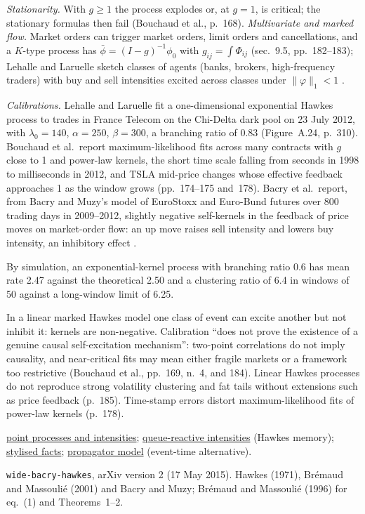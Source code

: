 \begin{qfmodel}
\emph{Stationarity.} With $g\ge1$ the process explodes or, at $g=1$, is critical; the stationary formulas then fail (Bouchaud et al., p.~168). \emph{Multivariate and marked flow.} Market orders can trigger market orders, limit orders and cancellations, and a $K$-type process has $\bar\phi=(I-g)^{-1}\phi_0$ with $g_{ij}=\int\Phi_{ij}$ (sec.~9.5, pp.~182--183); Lehalle and Laruelle sketch classes of agents (banks, brokers, high-frequency traders) with buy and sell intensities excited across classes under $\|\varphi\|_1<1$ \citep[app.~A, sec.~A.12.3, pp.~315--316]{alpha-laruelle}.

 \emph{Calibrations.} Lehalle and Laruelle fit a one-dimensional exponential Hawkes process to trades in France Telecom on the Chi-Delta dark pool on 23 July 2012, with $\lambda_0=140$, $\alpha=250$, $\beta=300$, a branching ratio of 0.83 (Figure~A.24, p.~310). Bouchaud et al.\ report maximum-likelihood fits across many contracts with $g$ close to 1 and power-law kernels, the short time scale falling from seconds in 1998 to milliseconds in 2012, and TSLA mid-price changes whose effective feedback approaches 1 as the window grows (pp.~174--175 and~178). Bacry et al.\ report, from Bacry and Muzy's model of EuroStoxx and Euro-Bund futures over 800 trading days in 2009--2012, slightly negative self-kernels in the feedback of price moves on market-order flow: an up move raises sell intensity and lowers buy intensity, an inhibitory effect \citep[arXiv v2, sec.~5.1, p.~27]{wide-bacry-hawkes}.

By simulation, an exponential-kernel process with branching ratio 0.6 has mean rate 2.47 against the theoretical 2.50 and a clustering ratio of 6.4 in windows of 50 against a long-window limit of 6.25.

 In a linear marked Hawkes model one class of event can excite another but not inhibit it: kernels are non-negative. Calibration ``does not prove the existence of a genuine causal self-excitation mechanism'': two-point correlations do not imply causality, and near-critical fits may mean either fragile markets or a framework too restrictive (Bouchaud et al., pp.~169, n.~4, and 184). Linear Hawkes processes do not reproduce strong volatility clustering and fat tails without extensions such as price feedback (p.~185). Time-stamp errors distort maximum-likelihood fits of power-law kernels (p.~178).

 \hyperref[def:order-event-point-processes]{point processes and intensities}; \hyperref[mod:queue-reactive-intensities]{queue-reactive intensities} (Hawkes memory); \hyperref[ev:high-frequency-stylised-facts]{stylised facts}; \hyperref[mod:propagator]{propagator model} (event-time alternative).

 \nolinkurl{wide-bacry-hawkes}, arXiv version 2 (17 May 2015). Hawkes (1971), Brémaud and Massoulié (2001) and Bacry and Muzy; Brémaud and Massoulié (1996) for eq.~(1) and Theorems~1--2.

\end{qfmodel}
